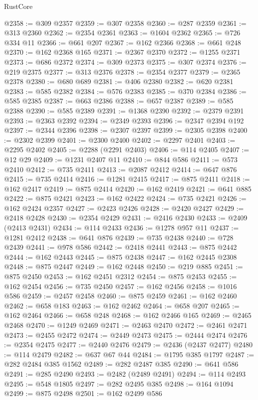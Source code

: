 \begin{lexlean}{RustCore}
\begin{coremodule}
@2358 := @309 @2357
@2359 := @307 @2358
@2360 := @287 @2359
@2361 := @313 @2360
@2362 := @2354 @2361
@2363 := @1604 @2362
@2365 := @726 @334 @11
@2366 := @661 @207
@2367 := @162 @2366
@2368 := @661 @248
@2370 := @162 @2368 @165
@2371 := @2367 @2370
@2372 := @1255 @2371
@2373 := @686 @2372
@2374 := @309 @2373
@2375 := @307 @2374
@2376 := @219 @2375
@2377 := @313 @2376
@2378 := @2354 @2377
@2379 := @2365 @2378
@2380 := @680 @689
@2381 := @406 @2380
@2382 := @620 @2381
@2383 := @585 @2382
@2384 := @576 @2383
@2385 := @370 @2384
@2386 := @585 @2385
@2387 := @663 @2386
@2388 := @657 @2387
@2389 := @585 @2388
@2390 := @585 @2389
@2391 := @1368 @2390
@2392 := @2379 @2391
@2393 := @2363 @2392
@2394 := @2349 @2393
@2396 := @2347 @2394 @192
@2397 := @2344 @2396
@2398 := @2307 @2397
@2399 := @2305 @2398
@2400 := @2302 @2399
@2401 := @2300 @2400
@2402 := @2297 @2401
@2403 := @2295 @2402
@2405 := @2288 (@2291 @2403)
@2406 := @114 @2405
@2407 := @12 @29
@2409 := @1231 @2407 @11
@2410 := @844 @586
@2411 := @573 @2410
@2412 := @735 @2411
@2413 := @2087 @2412
@2414 := @647 @876
@2415 := @735 @2414
@2416 := @1281 @2415
@2417 := @875 @2411
@2418 := @162 @2417
@2419 := @875 @2414
@2420 := @162 @2419
@2421 := @641 @885
@2422 := @875 @2421
@2423 := @162 @2422
@2424 := @735 @2421
@2426 := @162 @2424 @2357
@2427 := @2423 @2426
@2428 := @2420 @2427
@2429 := @2418 @2428
@2430 := @2354 @2429
@2431 := @2416 @2430
@2433 := @2409 (@2413 @2431)
@2434 := @114 @2433
@2436 := @1278 @957 @11
@2437 := @1281 @2412
@2438 := @641 @876
@2439 := @735 @2438
@2440 := @728 @2439
@2441 := @978 @586
@2442 := @2418 @2441
@2443 := @875 @2442
@2444 := @162 @2443
@2445 := @875 @2438
@2447 := @162 @2445 @2308
@2448 := @875 @2447
@2449 := @162 @2448
@2450 := @219 @885
@2451 := @875 @2450
@2453 := @162 @2451 @2312
@2454 := @875 @2453
@2455 := @162 @2454
@2456 := @735 @2450
@2457 := @162 @2456
@2458 := @1016 @586
@2459 := @2457 @2458
@2460 := @875 @2459
@2461 := @162 @2460
@2462 := @658 @183
@2463 := @162 @2462
@2464 := @658 @207
@2465 := @162 @2464
@2466 := @658 @248
@2468 := @162 @2466 @165
@2469 := @2465 @2468
@2470 := @1249 @2469
@2471 := @2463 @2470
@2472 := @2461 @2471
@2473 := @2455 @2472
@2474 := @2449 @2473
@2475 := @2444 @2474
@2476 := @2354 @2475
@2477 := @2440 @2476
@2479 := @2436 (@2437 @2477)
@2480 := @114 @2479
@2482 := @637 @67 @44
@2484 := @1795 @385 @1797
@2487 := @282 @2484 @385 @1562
@2489 := @282 @2487 @385
@2490 := @641 @586
@2491 := @285 @2490
@2493 := @2482 (@2489 @2491)
@2494 := @114 @2493
@2495 := @548 @1805
@2497 := @282 @2495 @385
@2498 := @164 @1094
@2499 := @875 @2498
@2501 := @162 @2499 @586

\end{coremodule}
\end{lexlean}
